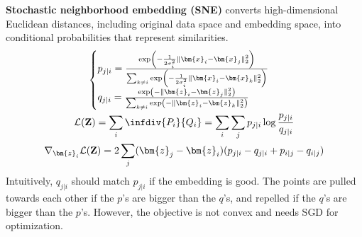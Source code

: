 \textbf{Stochastic neighborhood embedding (SNE)} converts high-dimensional Euclidean distances, 
including original data space and embedding space, into conditional probabilities that represent similarities.
\begin{gather}
    \begin{cases}
        p_{j|i} = \frac{\exp\left(-\frac{1}{2\sigma_i^2}\|\bm{x}_i-\bm{x}_j\|^2_2\right)}{\sum_{k\neq i}\exp\left(-\frac{1}{2\sigma_i^2}\|\bm{x}_i-\bm{x}_k\|^2_2\right)} \\
        q_{j|i} = \frac{\exp\left(-\|\bm{z}_i-\bm{z}_j\|^2_2\right)}{\sum_{k\neq i}\exp\left(-\|\bm{z}_i-\bm{z}_k\|^2_2\right)}
    \end{cases}\\
    \mathcal{L}(\mathbf{Z}) = \sum_{i}\infdiv{P_i}{Q_i} = \sum_i\sum_j p_{j|i}\log\frac{p_{j|i}}{q_{j|i}} \\
    \nabla_{\bm{z}_i}\mathcal{L}(\mathbf{Z}) = 2\sum_{j}(\bm{z}_j-\bm{z}_i)(p_{j|i}-q_{j|i}+p_{i|j}-q_{i|j})
\end{gather}
Intuitively, $q_{j|i}$ should match $p_{j|i}$ if the embedding is good. 
The points are pulled towards each other if the $p$'s are bigger than the $q$'s, 
and repelled if the $q$'s are bigger than the $p$'s.
However, the objective is not convex and needs SGD for optimization.
